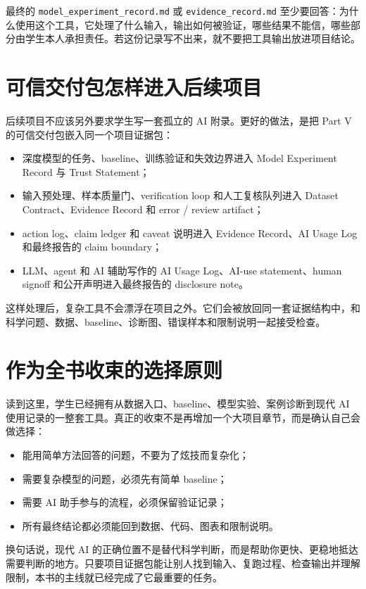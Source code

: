 最终的 \texttt{model\_experiment\_record.md} 或 \texttt{evidence\_record.md} 至少要回答：为什么使用这个工具，它处理了什么输入，输出如何被验证，哪些结果不能信，哪些部分由学生本人承担责任。若这份记录写不出来，就不要把工具输出放进项目结论。

\section*{可信交付包怎样进入后续项目}

后续项目不应该另外要求学生写一套孤立的 AI 附录。更好的做法，是把 Part V 的可信交付包嵌入同一个项目证据包：

\begin{itemize}
    \item 深度模型的任务、baseline、训练验证和失效边界进入 Model Experiment Record 与 Trust Statement；
    \item 输入预处理、样本质量门、verification loop 和人工复核队列进入 Dataset Contract、Evidence Record 和 error / review artifact；
    \item action log、claim ledger 和 caveat 说明进入 Evidence Record、AI Usage Log 和最终报告的 claim boundary；
    \item LLM、agent 和 AI 辅助写作的 AI Usage Log、AI-use statement、human signoff 和公开声明进入最终报告的 disclosure note。
\end{itemize}

这样处理后，复杂工具不会漂浮在项目之外。它们会被放回同一套证据结构中，和科学问题、数据、baseline、诊断图、错误样本和限制说明一起接受检查。

\section*{作为全书收束的选择原则}

读到这里，学生已经拥有从数据入口、baseline、模型实验、案例诊断到现代 AI 使用记录的一整套工具。真正的收束不是再增加一个大项目章节，而是确认自己会做选择：

\begin{itemize}
    \item 能用简单方法回答的问题，不要为了炫技而复杂化；
    \item 需要复杂模型的问题，必须先有简单 baseline；
    \item 需要 AI 助手参与的流程，必须保留验证记录；
    \item 所有最终结论都必须能回到数据、代码、图表和限制说明。
\end{itemize}

换句话说，现代 AI 的正确位置不是替代科学判断，而是帮助你更快、更稳地抵达需要判断的地方。只要项目证据包能让别人找到输入、复跑过程、检查输出并理解限制，本书的主线就已经完成了它最重要的任务。
